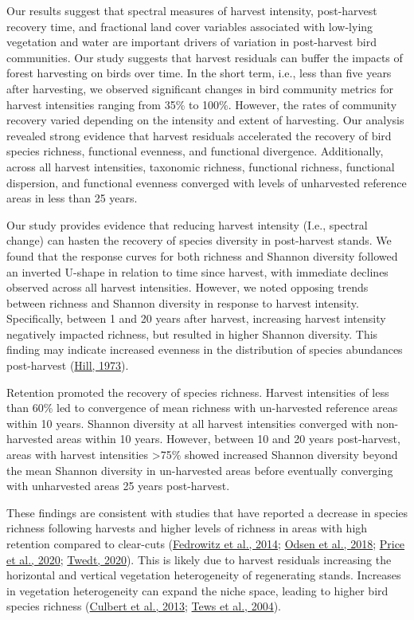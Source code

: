 \documentclass[
  12pt,
]{article}
\begin{document}
Our results suggest that spectral measures of harvest intensity, post-harvest recovery time, and fractional land cover variables associated with low-lying vegetation and water are important drivers of variation in post-harvest bird communities. Our study suggests that harvest residuals can buffer the impacts of forest harvesting on birds over time. In the short term, i.e., less than five years after harvesting, we observed significant changes in bird community metrics for harvest intensities ranging from 35\% to 100\%. However, the rates of community recovery varied depending on the intensity and extent of harvesting. Our analysis revealed strong evidence that harvest residuals accelerated the recovery of bird species richness, functional evenness, and functional divergence. Additionally, across all harvest intensities, taxonomic richness, functional richness, functional dispersion, and functional evenness converged with levels of unharvested reference areas in less than 25 years.

Our study provides evidence that reducing harvest intensity (I.e., spectral change) can hasten the recovery of species diversity in post-harvest stands. We found that the response curves for both richness and Shannon diversity followed an inverted U-shape in relation to time since harvest, with immediate declines observed across all harvest intensities. However, we noted opposing trends between richness and Shannon diversity in response to harvest intensity. Specifically, between 1 and 20 years after harvest, increasing harvest intensity negatively impacted richness, but resulted in higher Shannon diversity. This finding may indicate increased evenness in the distribution of species abundances post-harvest (\protect\hyperlink{ref-hill1973diversity}{Hill, 1973}).

Retention promoted the recovery of species richness. Harvest intensities of less than 60\% led to convergence of mean richness with un-harvested reference areas within 10 years. Shannon diversity at all harvest intensities converged with non-harvested areas within 10 years. However, between 10 and 20 years post-harvest, areas with harvest intensities \textgreater75\% showed increased Shannon diversity beyond the mean Shannon diversity in un-harvested areas before eventually converging with unharvested areas 25 years post-harvest.

These findings are consistent with studies that have reported a decrease in species richness following harvests and higher levels of richness in areas with high retention compared to clear-cuts (\protect\hyperlink{ref-FedrowitzKoricheva2014}{Fedrowitz et al., 2014}; \protect\hyperlink{ref-odsenBorealSongbirdsVariable2018}{Odsen et al., 2018}; \protect\hyperlink{ref-priceLongtermResponseForest2020}{Price et al., 2020}; \protect\hyperlink{ref-Twedt2019}{Twedt, 2020}). This is likely due to harvest residuals increasing the horizontal and vertical vegetation heterogeneity of regenerating stands. Increases in vegetation heterogeneity can expand the niche space, leading to higher bird species richness (\protect\hyperlink{ref-culbert2013influence}{Culbert et al., 2013}; \protect\hyperlink{ref-TewsBrose2004}{Tews et al., 2004}).
\end{document}
